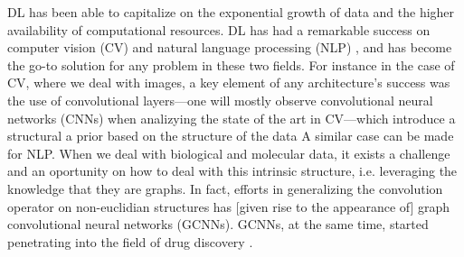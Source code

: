 \documentclass{article}
\begin{document}
 
DL has been able to capitalize on the exponential growth of data and the higher
 availability of computational resources. DL has had a remarkable success on computer
 vision (CV) \cite{Guo2016} and natural language processing (NLP) \cite{Young2018}, and
 has become the go-to solution for any problem in these two fields. For instance in the
 case of CV, where we deal with images, a key element of any architecture's success was
 the use of convolutional layers---one will mostly observe convolutional neural networks
 (CNNs) when analizying the state of the art in CV---which introduce a structural a
 prior based on the structure of the data\cite{Fukushima1980, LeCun1989, Ulyanov} A
 similar case can be made for NLP. When we deal with biological and
 molecular data, it exists a challenge and an oportunity on how to deal with this
 intrinsic structure, i.e. leveraging the knowledge that they are graphs. In fact,
 efforts in generalizing the convolution operator on non-euclidian structures has
 {\color{red}[given rise to the appearance of]} graph convolutional neural networks
 (GCNNs)\cite{Wu2019}. GCNNs, at the same time, started penetrating into the field of
 drug discovery \cite{Sun2019}.





\end{document}
